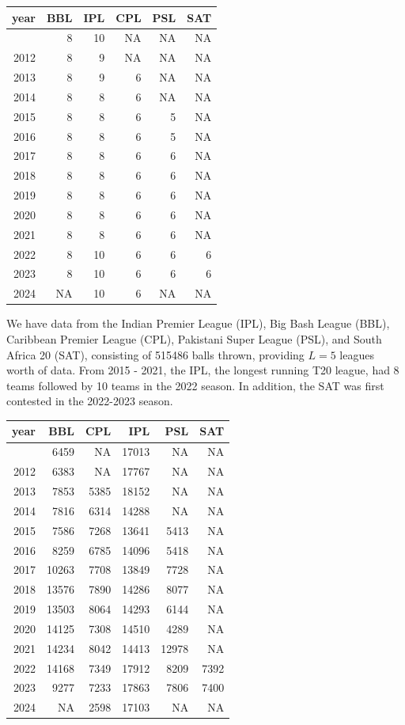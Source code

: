 \documentclass[
  12pt,
]{article}
\begin{document}
\begin{longtable}[]{@{}rrrrrr@{}}
\toprule\noalign{}
year & BBL & IPL & CPL & PSL & SAT \\
\midrule\noalign{}
\endhead
\bottomrule\noalign{}
\endlastfoot
2011 & 8 & 10 & NA & NA & NA \\
2012 & 8 & 9 & NA & NA & NA \\
2013 & 8 & 9 & 6 & NA & NA \\
2014 & 8 & 8 & 6 & NA & NA \\
2015 & 8 & 8 & 6 & 5 & NA \\
2016 & 8 & 8 & 6 & 5 & NA \\
2017 & 8 & 8 & 6 & 6 & NA \\
2018 & 8 & 8 & 6 & 6 & NA \\
2019 & 8 & 8 & 6 & 6 & NA \\
2020 & 8 & 8 & 6 & 6 & NA \\
2021 & 8 & 8 & 6 & 6 & NA \\
2022 & 8 & 10 & 6 & 6 & 6 \\
2023 & 8 & 10 & 6 & 6 & 6 \\
2024 & NA & 10 & 6 & NA & NA \\
\end{longtable}

We have data from the Indian Premier League (IPL), Big Bash League
(BBL), Caribbean Premier League (CPL), Pakistani Super League (PSL), and
South Africa 20 (SAT), consisting of 515486 balls thrown, providing
\(L = 5\) leagues worth of data. From 2015 - 2021, the IPL, the longest
running T20 league, had 8 teams followed by 10 teams in the 2022 season.
In addition, the SAT was first contested in the 2022-2023 season.

\begin{longtable}[]{@{}rrrrrr@{}}
\toprule\noalign{}
year & BBL & CPL & IPL & PSL & SAT \\
\midrule\noalign{}
\endhead
\bottomrule\noalign{}
\endlastfoot
2011 & 6459 & NA & 17013 & NA & NA \\
2012 & 6383 & NA & 17767 & NA & NA \\
2013 & 7853 & 5385 & 18152 & NA & NA \\
2014 & 7816 & 6314 & 14288 & NA & NA \\
2015 & 7586 & 7268 & 13641 & 5413 & NA \\
2016 & 8259 & 6785 & 14096 & 5418 & NA \\
2017 & 10263 & 7708 & 13849 & 7728 & NA \\
2018 & 13576 & 7890 & 14286 & 8077 & NA \\
2019 & 13503 & 8064 & 14293 & 6144 & NA \\
2020 & 14125 & 7308 & 14510 & 4289 & NA \\
2021 & 14234 & 8042 & 14413 & 12978 & NA \\
2022 & 14168 & 7349 & 17912 & 8209 & 7392 \\
2023 & 9277 & 7233 & 17863 & 7806 & 7400 \\
2024 & NA & 2598 & 17103 & NA & NA \\
\end{longtable}
\end{document}
